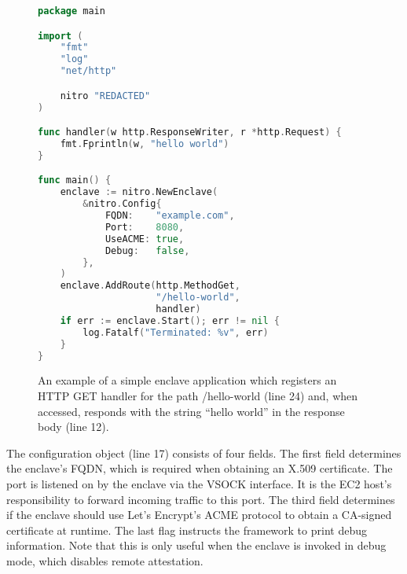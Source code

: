 \begin{figure}[t]
\begin{lstlisting}[language=go]
package main

import (
    "fmt"
    "log"
    "net/http"

    nitro "REDACTED"
)

func handler(w http.ResponseWriter, r *http.Request) {
    fmt.Fprintln(w, "hello world")
}

func main() {
    enclave := nitro.NewEnclave(
        &nitro.Config{
            FQDN:    "example.com",
            Port:    8080,
            UseACME: true,
            Debug:   false,
        },
    )
    enclave.AddRoute(http.MethodGet,
                     "/hello-world",
                     handler)
    if err := enclave.Start(); err != nil {
        log.Fatalf("Terminated: %v", err)
    }
}
\end{lstlisting}
\caption{An example of a simple enclave application which registers an HTTP GET
  handler for the path /hello-world (line 24) and, when accessed, responds with
  the string ``hello world'' in the response body (line 12).}
\label{fig:hello-world}
\end{figure}

The configuration object (line 17) consists of four fields.  The first field
determines the enclave's FQDN, which is required when obtaining an X.509
certificate.  The port is listened on by the enclave via the VSOCK interface.
It is the EC2 host's responsibility to forward incoming traffic to
this port.  The third field determines if the enclave should use Let's Encrypt's
ACME protocol to obtain a CA-signed certificate at runtime.
The last flag instructs the framework to print debug information.  Note that
this is only useful when the enclave is invoked in debug mode, which disables
remote attestation.
